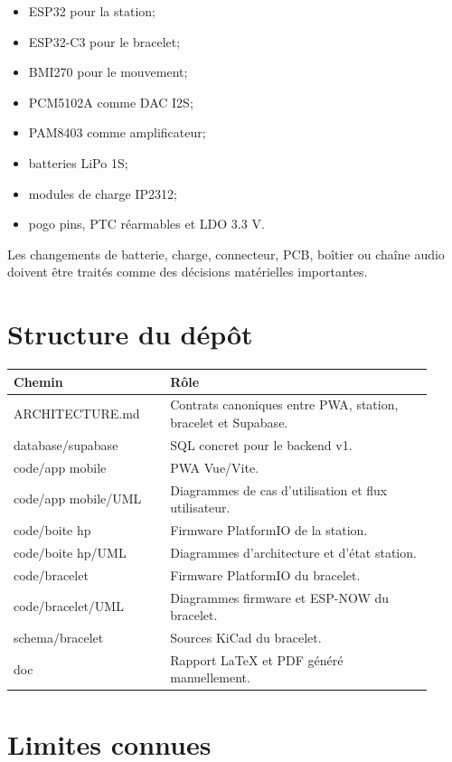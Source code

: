 \documentclass[11pt,a4paper]{article}
\begin{document}
\begin{itemize}
  \item ESP32 pour la station;
  \item ESP32-C3 pour le bracelet;
  \item BMI270 pour le mouvement;
  \item PCM5102A comme DAC I2S;
  \item PAM8403 comme amplificateur;
  \item batteries LiPo 1S;
  \item modules de charge IP2312;
  \item pogo pins, PTC réarmables et LDO 3.3 V.
\end{itemize}

Les changements de batterie, charge, connecteur, PCB, boîtier ou chaîne audio doivent être traités comme des décisions matérielles importantes.

\section{Structure du dépôt}

\begin{longtable}{>{\ttfamily}p{0.34\linewidth}p{0.58\linewidth}}
\toprule
\normalfont Chemin & Rôle \\
\midrule
\endhead
ARCHITECTURE.md & Contrats canoniques entre PWA, station, bracelet et Supabase. \\
database/supabase & SQL concret pour le backend v1. \\
code/app mobile & PWA Vue/Vite. \\
code/app mobile/UML & Diagrammes de cas d'utilisation et flux utilisateur. \\
code/boite hp & Firmware PlatformIO de la station. \\
code/boite hp/UML & Diagrammes d'architecture et d'état station. \\
code/bracelet & Firmware PlatformIO du bracelet. \\
code/bracelet/UML & Diagrammes firmware et ESP-NOW du bracelet. \\
schema/bracelet & Sources KiCad du bracelet. \\
doc & Rapport LaTeX et PDF généré manuellement. \\
\bottomrule
\end{longtable}

\section{Limites connues}
\end{document}
